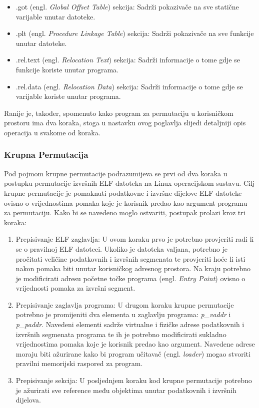 \documentclass[times, utf8, diplomski, numeric]{fer}
\begin{document}
\begin{itemize}
\item .got (engl. \emph{Global Offset Table}) sekcija: Sadrži pokazivače na sve statične varijable unutar datoteke.
\item .plt (engl. \emph{Procedure Linkage Table}) sekcija: Sadrži pokazivače na sve funkcije unutar datoteke.
\item .rel.text (engl. \emph{Relocation Text}) sekcija: Sadrži informacije o tome gdje se funkcije koriste unutar programa.
\item .rel.data (engl. \emph{Relocation Data}) sekcija: Sadrži informacije o tome gdje se varijable koriste unutar programa.
\end{itemize}

Ranije je, također, spomenuto kako program za permutaciju u
korisničkom prostoru ima dva koraka, stoga u nastavku ovog
poglavlja slijedi detaljniji opis operacija u svakome od koraka.

\subsubsection{Krupna Permutacija}

Pod pojmom krupne permutacije podrazumijeva se prvi od dva koraka u
postupku permutacije izvršnih ELF datoteka na Linux operacijskom
sustavu. Cilj krupne permutacije je pomaknuti podatkovne i
izvršne dijelove ELF datoteke ovisno o vrijednostima pomaka koje
je korisnik predao kao argument programu za permutaciju. Kako bi
se navedeno moglo ostvariti, postupak prolazi kroz tri koraka:

\begin{enumerate}
\item Prepisivanje ELF zaglavlja: U ovom koraku prvo je potrebno
provjeriti radi li se o pravilnoj ELF datoteci. Ukoliko je
datoteka valjana, potrebno je pročitati veličine podatkovnih i
izvršnih segmenata te provjeriti hoće li isti nakon pomaka biti
unutar korisničkog adresnog prostora. Na kraju potrebno je
modificirati adresu početne točke programa (engl. \emph{Entry
Point}) ovisno o vrijednosti pomaka za izvršni segment.

\item Prepisivanje zaglavlja programa: U drugom koraku krupne
permutacije potrebno je promijeniti dva elementa u zaglavlju
programa: \emph{p\_vaddr} i \emph{p\_paddr}. Navedeni elementi
sadrže virtualne i fizičke adrese podatkovnih i izvršnih
segmenata programa te ih je potrebno modificirati sukladno
vrijednostima pomaka koje je korisnik predao kao argument.
Navedene adrese moraju biti ažurirane kako bi program učitavač 
(engl. \emph{loader}) mogao stvoriti pravilni memorijski raspored
za program.

\item Prepisivanje sekcija: U posljednjem koraku kod krupne
permutacije potrebno je ažurirati sve reference među objektima
unutar podatkovnih i izvršnih dijelova. 
\end{enumerate}
\end{document}
